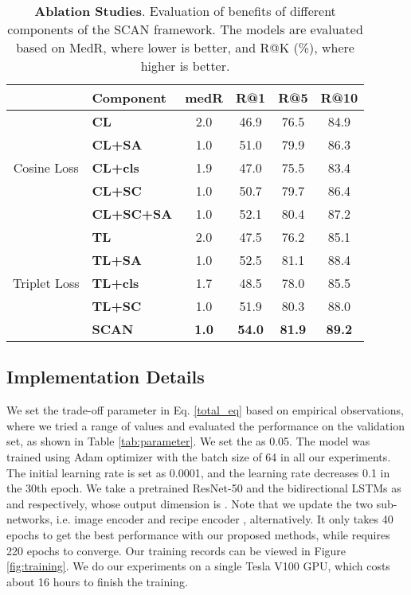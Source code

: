 \documentclass[journal]{IEEEtran}
\begin{document}
\begin{table*}
  \centering
  \caption{\textbf{Ablation Studies}. Evaluation of benefits of different components of the SCAN framework. The models are evaluated based on MedR, where lower is better, and R@K (\%), where higher is better.}
  {
    \begin{tabular}{clcccc}
    \toprule
    \multicolumn{1}{c}{} & \textbf{Component} & \textbf{medR } & \textbf{R@1 } &\textbf{R@5 }& \textbf{R@10 } \\
    \midrule
    \multirow{5}{*}{{Cosine Loss}}
    &\textbf{CL} & 2.0   & 46.9  & 76.5  & 84.9 \\
    &\textbf{CL+SA} & 1.0 & 51.0  & 79.9 & 86.3 \\
    \cline{2-6}
    &\textbf{CL+cls} & 1.9 & 47.0  & 75.5  & 83.4 \\
    &\textbf{CL+SC} & 1.0  & 50.7  & 79.7  & 86.4 \\
    \cline{2-6}
    &\textbf{CL+SC+SA} & 1.0  & 52.1  & 80.4  & 87.2 \\
    \midrule
    \multirow{5}{*}{{Triplet Loss}}
    &\textbf{TL} & 2.0   & 47.5  & 76.2  & 85.1 \\
    &\textbf{TL+SA} & 1.0   & 52.5  & 81.1 & 88.4 \\
    \cline{2-6}
    &\textbf{TL+cls} & 1.7 & 48.5  & 78.0  & 85.5 \\
    &\textbf{TL+SC} & 1.0  & 51.9  & 80.3  & 88.0 \\
    \cline{2-6}
    &\textbf{SCAN} & \textbf{1.0} & \textbf{54.0}  & \textbf{81.9}  & \textbf{89.2} \\
    \bottomrule
    \end{tabular}}
  \label{tab:ablation}\end{table*}

\subsection{Implementation Details}
We set the trade-off parameter  in Eq. \eqref{total_eq} based on empirical observations, where we tried a range of values and evaluated the performance on the validation set, as shown in Table \ref{tab:parameter}. We set the  as 0.05. The model was trained using Adam optimizer \cite{kingma2014adam} with the batch size of 64 in all our experiments. The initial learning rate is set as 0.0001, and the learning rate decreases 0.1 in the 30th epoch. We take a pretrained ResNet-50 and the bidirectional LSTMs as  and  respectively, whose output dimension is . Note that we update the two sub-networks, i.e. image encoder  and recipe encoder , alternatively. It only takes 40 epochs to get the best performance with our proposed methods, while \cite{salvador2017learning} requires 220 epochs to converge. Our training records can be viewed in Figure \ref{fig:training}. We do our experiments on a single Tesla V100 GPU, which costs about 16 hours to finish the training.
\end{document}
